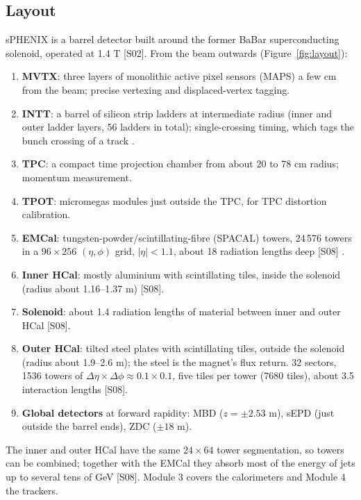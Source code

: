 \documentclass[11pt,letterpaper]{article}
\begin{document}
\subsection{Layout}
sPHENIX is a barrel detector built around the former BaBar superconducting solenoid, operated at 1.4 T
[S02]. From the beam outwards (Figure~\ref{fig:layout}):
\begin{enumerate}
\item \textbf{MVTX}: three layers of monolithic active pixel sensors (MAPS) a few cm from the beam; precise vertexing and
displaced-vertex tagging.
\item \textbf{INTT}: a barrel of silicon strip ladders at intermediate radius (inner and outer ladder layers, 56 ladders in total); single-crossing timing,
which tags the bunch crossing of a track \cite{intt1,intt2}.
\item \textbf{TPC}: a compact time projection chamber from about 20 to 78 cm radius; momentum measurement.
\item \textbf{TPOT}: micromegas modules just outside the TPC, for TPC distortion calibration.
\item \textbf{EMCal}: tungsten-powder/scintillating-fibre (SPACAL) towers, 24\,576 towers in a $96\times256$ $(\eta,\phi)$ grid,
$|\eta|<1.1$, about 18 radiation lengths deep [S08] \cite{calo}.
\item \textbf{Inner HCal}: mostly aluminium with scintillating tiles, inside the solenoid (radius about 1.16--1.37 m) [S08].
\item \textbf{Solenoid}: about 1.4 radiation lengths of material between inner and outer HCal [S08].
\item \textbf{Outer HCal}: tilted steel plates with scintillating tiles, outside the solenoid (radius about 1.9--2.6 m); the steel is
the magnet's flux return. 32 sectors, 1536 towers of $\Delta\eta\times\Delta\phi\approx0.1\times0.1$, five tiles per tower
(7680 tiles), about 3.5 interaction lengths [S08].
\item \textbf{Global detectors} at forward rapidity: MBD ($z=\pm2.53$ m), sEPD (just outside the barrel ends), ZDC ($\pm18$ m).
\end{enumerate}
The inner and outer HCal have the same $24\times64$ tower segmentation, so towers can be combined; together with the EMCal
they absorb most of the energy of jets up to several tens of GeV [S08]. Module 3 covers the calorimeters and Module 4 the trackers.
\end{document}
